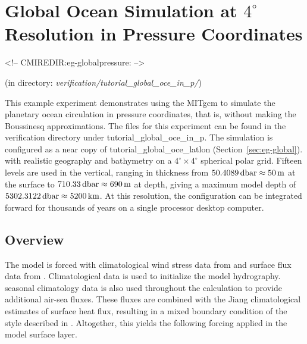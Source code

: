 
\section[P coordinate Global Ocean MITgcm Example]{Global Ocean Simulation at $4^\circ$ Resolution in Pressure
  Coordinates}
\label{sec:eg-globalpressure}
\begin{rawhtml}
<!-- CMIREDIR:eg-globalpressure: -->
\end{rawhtml}
\begin{center}
(in directory: {\it verification/tutorial\_global\_oce\_in\_p/})
\end{center}


This example experiment demonstrates using the MITgcm to simulate the
planetary ocean circulation in pressure coordinates, that is, without
making the Boussinesq approximations. The files for this experiment
can be found in the verification directory under tutorial\_global\_oce\_in\_p.
The simulation is configured as a near copy of
tutorial\_global\_oce\_latlon (Section~\ref{sec:eg-global}).
with realistic geography and bathymetry on a $4^{\circ} \times
4^{\circ}$ spherical polar grid.  Fifteen levels are used in the
vertical, ranging in thickness from
$50.4089\mbox{\,dbar}\approx50\mbox{\,m}$ at the surface to
$710.33\mbox{\,dbar}\approx690\mbox{\,m}$ at depth, giving a maximum
model depth of $5302.3122\mbox{\,dbar}\approx5200\mbox{\,km}$.  At
this resolution, the configuration can be integrated forward for
thousands of years on a single processor desktop computer.


\subsection{Overview}

The model is forced with climatological wind stress data from
\citet{trenberth90} and surface flux data from
\citet{jiang99}. Climatological data \citep{Levitus94} is
used to initialize the model hydrography. \citeauthor{Levitus94} seasonal
climatology data is also used throughout the calculation to provide
additional air-sea fluxes.  These fluxes are combined with the Jiang
climatological estimates of surface heat flux, resulting in a mixed
boundary condition of the style described in \citet{Haney}.
Altogether, this yields the following forcing applied in the model
surface layer.

